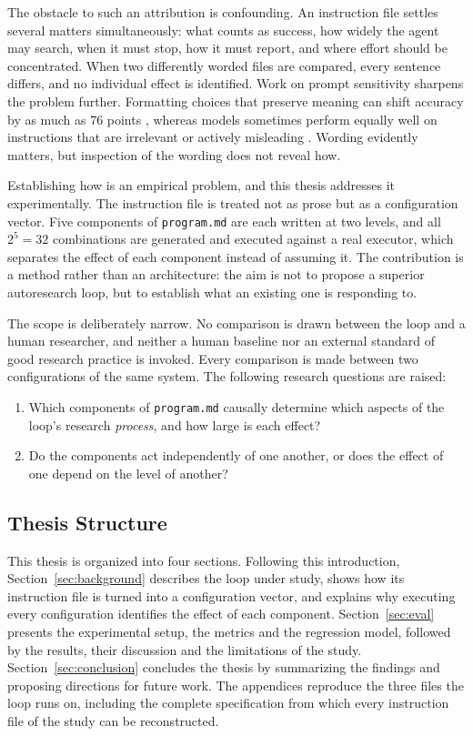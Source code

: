 \documentclass[11pt]{article}
\begin{document}
The obstacle to such an attribution is confounding. An instruction file settles several matters simultaneously: what counts as success, how widely the agent may search, when it must stop, how it must report, and where effort should be concentrated. When two differently worded files are compared, every sentence differs, and no individual effect is identified. Work on prompt sensitivity sharpens the problem further. Formatting choices that preserve meaning can shift accuracy by as much as 76 points \cite{Sclar2024formatspread}, whereas models sometimes perform equally well on instructions that are irrelevant or actively misleading \cite{Webson2022prompts}. Wording evidently matters, but inspection of the wording does not reveal how.

Establishing how is an empirical problem, and this thesis addresses it experimentally. The instruction file is treated not as prose but as a configuration vector. Five components of \texttt{program.md} are each written at two levels, and all $2^5 = 32$ combinations are generated and executed against a real executor, which separates the effect of each component instead of assuming it. The contribution is a method rather than an architecture: the aim is not to propose a superior autoresearch loop, but to establish what an existing one is responding to.

The scope is deliberately narrow. No comparison is drawn between the loop and a human researcher, and neither a human baseline nor an external standard of good research practice is invoked. Every comparison is made between two configurations of the same system. The following research questions are raised:

\begin{enumerate}
\item[\textbf{RQ1}] Which components of \texttt{program.md} causally determine which aspects of the loop's research \emph{process}, and how large is each effect?
\item[\textbf{RQ2}] Do the components act independently of one another, or does the effect of one depend on the level of another?
\end{enumerate}

\subsection{Thesis Structure}

This thesis is organized into four sections. Following this introduction, Section~\ref{sec:background} describes the loop under study, shows how its instruction file is turned into a configuration vector, and explains why executing every configuration identifies the effect of each component. Section~\ref{sec:eval} presents the experimental setup, the metrics and the regression model, followed by the results, their discussion and the limitations of the study. Section~\ref{sec:conclusion} concludes the thesis by summarizing the findings and proposing directions for future work. The appendices reproduce the three files the loop runs on, including the complete specification from which every instruction file of the study can be reconstructed.
\end{document}
